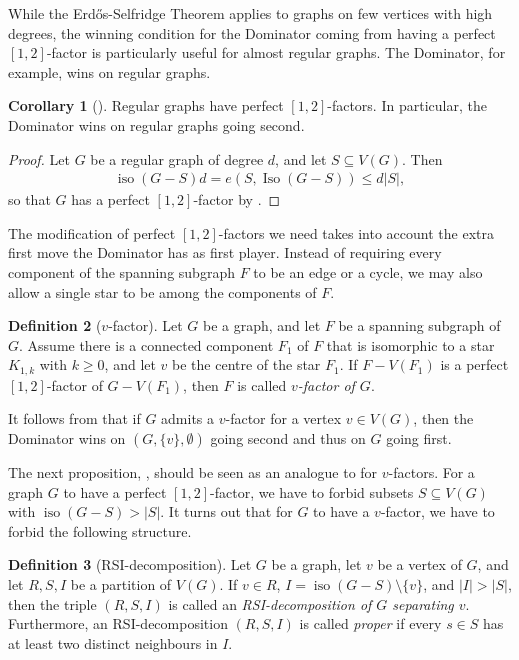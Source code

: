 \documentclass[a4paper,11pt,oneside]{scrartcl}
\theoremstyle{definition}
\newtheorem{definition}{Definition}
\newtheorem{corollary}[definition]{Corollary}
\theoremstyle{remark}
\DeclareMathOperator{\Iso}{Iso}
\DeclareMathOperator{\iso}{iso}
\begin{document}
While the Erd\H{o}s-Selfridge Theorem applies to graphs on few vertices with high degrees, the winning condition for the Dominator coming from having a perfect $[1,2]$-factor is particularly useful for almost regular graphs. The Dominator, for example, wins on regular graphs. 


\begin{corollary}[{\cite[Corollary 3.5]{BDGLP}}]\label{corollary:Dominator_wins_on_regular_graphs} 
Regular graphs have perfect $[1,2]$-factors. In particular, the Dominator wins on regular graphs going second. 
\end{corollary}
\begin{proof}
Let $G$ be a regular graph of degree $d$, and let $S \subseteq V(G)$. Then 
\begin{align*}
    \iso(G-S) d = e(S, \Iso(G-S)) \leq d|S|, 
\end{align*}
so that $G$ has a perfect $[1,2]$-factor by .
\end{proof}
The modification of perfect $[1,2]$-factors we need takes into account the extra first move the Dominator has as first player. Instead of requiring every component of the spanning subgraph $F$ to be an edge or a cycle, we may also allow a single star to be among the components of $F$.

\begin{definition}[$v$-factor]\label{definition:v-factors}
    Let $G$ be a graph, and let $F$ be a spanning subgraph of $G$. Assume there is a connected component $F_1$ of $F$ that is isomorphic to a star $K_{1,k}$ with $k \geq 0$, and let $v$ be the centre of the star $F_1$. If $F - V(F_1)$ is a perfect $[1,2]$-factor of $G - V(F_1)$, then $F$ is called \emph{$v$-factor of $G$}.
\end{definition}

It follows from  that if $G$ admits a $v$-factor for a vertex $v \in V(G)$, then the Dominator wins on $(G,\{v\},\emptyset)$ going second and thus on $G$ going first.

The next proposition, , should be seen as an analogue to  for $v$-factors. For a graph $G$ to have a perfect $[1,2]$-factor, we have to forbid subsets $S\subseteq V(G)$ with $\iso(G-S) > |S|$. It turns out that for $G$ to have a $v$-factor, we have to forbid the following structure.

\begin{definition}[RSI-decomposition]\label{definition:RSI_decomp}
    Let $G$ be a graph, let $v$ be a vertex of $G$, and let $R,S,I$ be a partition of $V(G)$. If $v\in R$, $I = \iso(G-S) \setminus \{v\}$, and $|I|>|S|$, then the triple $(R,S,I)$ is called an \emph{RSI-decomposition of $G$ separating $v$}. Furthermore, an RSI-decomposition $(R,S,I)$ is called \emph{proper} if every $s\in S$ has at least two distinct neighbours in $I$. 
\end{definition}
\end{document}
